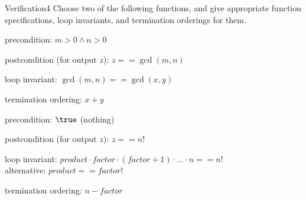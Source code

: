 \documentclass[a4paper]{article}
\begin{document}
\header

\begin{problem}{Verification}{4}
Choose two of the following functions, and give appropriate function specifications, loop invariants, and termination orderings for them.

\begin{acode}
\end{acode}

\begin{solution}
\begin{compactitem}
\item precondition: $m>0\wedge n>0$
\item postcondition (for output $z$): $z==\gcd(m,n)$
\item loop invariant: $\gcd(m,n)==\gcd(x,y)$
\item termination ordering: $x+y$
\end{compactitem}
\end{solution}

\begin{acode}
\end{acode}

\begin{solution}
\begin{compactitem}
\item precondition: $\true$ (nothing)
\item postcondition (for output $z$): $z==n!$
\item loop invariant: $product\cdot factor\cdot (factor+1)\cdot\ldots \cdot n==n!$ \\
alternative: $product==factor!$
\item termination ordering: $n-factor$
\end{compactitem}
\end{solution}

\begin{acode}
\end{acode}


\end{problem}
\end{document}
